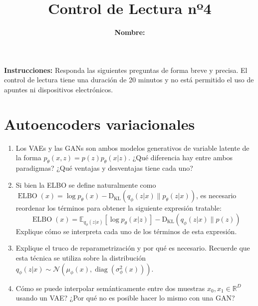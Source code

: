 \documentclass{article}
\title{\bfseries{Control de Lectura nº4}\vspace{0.5cm}}
\author{\textbf{Nombre:} \rule{12cm}{0.4pt}}
\newcommand{\R}{\mathbb{R}}
\begin{document}
\maketitle

\hspace{-0.5cm}\textbf{Instrucciones:} Responda las siguientes preguntas de forma breve y precisa. El control de lectura tiene una duración de 20 minutos y no está permitido el uso de apuntes ni dispositivos electrónicos.

\section*{Autoencoders variacionales}
\begin{enumerate}[{\bf P1.}]
	\item Los VAEs y las GANs son ambos modelos generativos de variable latente de la forma $p_\theta(x,z)=p(z)p_\theta(x|z)$. ¿Qué diferencia hay entre ambos paradigmas? ¿Qué ventajas y desventajas tiene cada uno?
	\item Si bien la ELBO se define naturalmente como $\operatorname{ELBO}(x)= \log p_\theta(x)-\operatorname{{D}_{KL}}\left(q_\phi(z|x)\| p_\theta(z|x)\right)$, es necesario reordenar los términos para obtener la siguiente expresión tratable:
	\begin{equation*}
		\operatorname{ELBO}(x)=\mathbb{E}_{q_\phi(z|x)}\left[\log p_\theta(x|z)\right] - \operatorname{{D}_{KL}}\left(q_\phi(z|x)\| p(z)\right)
	\end{equation*}
	Explique cómo se interpreta cada uno de los términos de esta expresión.
	\item Explique el truco de reparametrización y por qué es necesario. Recuerde que esta técnica se utiliza sobre la distribución $q_\phi(z|x) \sim \mathcal{N}(\mu_\phi(x), \operatorname{diag}(\sigma^2_\phi(x)))$.
	\item Cómo se puede interpolar semánticamente entre dos muestras $x_0,x_1\in\R^D$ usando un VAE? ¿Por qué no es posible hacer lo mismo con una GAN?
\end{enumerate}
\end{document}
